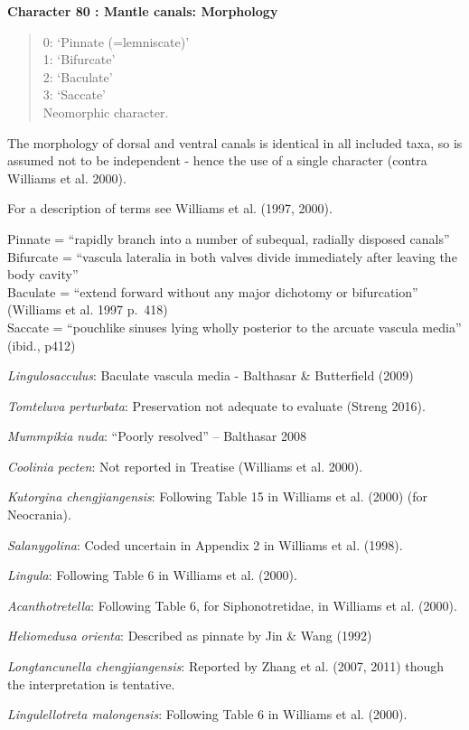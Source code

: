\documentclass[]{book}
\theoremstyle{definition}
\theoremstyle{definition}
\theoremstyle{definition}
\theoremstyle{remark}
\begin{document}
\textbf{Character 80 : Mantle canals: Morphology }

\begin{quote}
0: `Pinnate (=lemniscate)'\\
1: `Bifurcate'\\
2: `Baculate'\\
3: `Saccate'\\
Neomorphic character.
\end{quote}

The morphology of dorsal and ventral canals is identical in all included
taxa, so is assumed not to be independent - hence the use of a single
character (contra Williams et al. 2000).

For a description of terms see Williams et al. (1997, 2000).

Pinnate = ``rapidly branch into a number of subequal, radially disposed
canals''\\
Bifurcate = ``vascula lateralia in both valves divide immediately after
leaving the body cavity''\\
Baculate = ``extend forward without any major dichotomy or bifurcation''
(Williams et al. 1997 p.~418)\\
Saccate = ``pouchlike sinuses lying wholly posterior to the arcuate
vascula media'' (ibid., p412)

\emph{Lingulosacculus}: Baculate vascula media - Balthasar \&
Butterfield (2009)

\emph{Tomteluva perturbata}: Preservation not adequate to evaluate
(Streng 2016).

\emph{Mummpikia nuda}: ``Poorly resolved'' -- Balthasar 2008

\emph{Coolinia pecten}: Not reported in Treatise (Williams et al. 2000).

\emph{Kutorgina chengjiangensis}: Following Table 15 in Williams et al.
(2000) (for Neocrania).

\emph{Salanygolina}: Coded uncertain in Appendix 2 in Williams et al.
(1998).

\emph{Lingula}: Following Table 6 in Williams et al. (2000).

\emph{Acanthotretella}: Following Table 6, for Siphonotretidae, in
Williams et al. (2000).

\emph{Heliomedusa orienta}: Described as pinnate by Jin \& Wang (1992)

\emph{Longtancunella chengjiangensis}: Reported by Zhang et al. (2007,
2011) though the interpretation is tentative.

\emph{Lingulellotreta malongensis}: Following Table 6 in Williams et al.
(2000).
\end{document}
